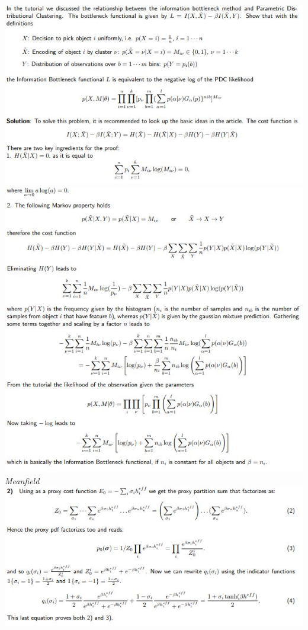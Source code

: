 \documentclass[9pt,parskip]{scrartcl}
\begin{document}
\begin{multicols*}{4}
\begin{center}
\includegraphics[width=\linewidth]{pictures/proofPDC1.jpg}
\includegraphics[width=\linewidth]{pictures/proofPDC2.jpg}
\textit{Meanfield}
\includegraphics[width=\linewidth]{pictures/derivationMeanfield.jpg}

\end{center}
\end{multicols*}
\end{document}
